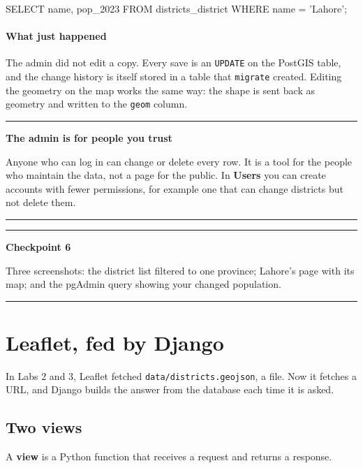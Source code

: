 \documentclass{article}
\newcommand{\cd}[1]{\texttt{#1}}
\newenvironment{keypoint}[1]
  {\par\vspace{.7em}\noindent\rule{\linewidth}{.6pt}\par\vspace{.15em}
   \noindent\textbf{#1}\par\nobreak\vspace{-.3em}}
  {\par\vspace{.15em}\noindent\rule{\linewidth}{.6pt}\par\vspace{.7em}}
\begin{document}
\begin{code}
SELECT name, pop_2023 FROM districts_district WHERE name = 'Lahore';
\end{code}

\paragraph{What just happened}
The admin did not edit a copy. Every save is an \cd{UPDATE} on the
PostGIS table, and the change history is itself stored in a table that
\cd{migrate} created. Editing the geometry on the map works the same
way: the shape is sent back as geometry and written to the \cd{geom}
column.

\begin{keypoint}{The admin is for people you trust}
Anyone who can log in can change or delete every row. It is a tool for
the people who maintain the data, not a page for the public. In
\textbf{Users} you can create accounts with fewer permissions, for
example one that can change districts but not delete them.
\end{keypoint}

\begin{keypoint}{Checkpoint 6}
Three screenshots: the district list filtered to one province; Lahore's
page with its map; and the pgAdmin query showing your changed
population.
\end{keypoint}


\section{Leaflet, fed by Django}

In Labs 2 and 3, Leaflet fetched \cd{data/districts.geojson}, a file.
Now it fetches a URL, and Django builds the answer from the database each
time it is asked.

\subsection{Two views}

A \textbf{view} is a Python function that receives a request and returns
a response.
\end{document}
